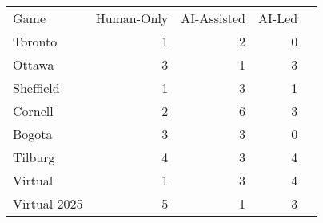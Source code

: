 \begin{tabular}{lrrrr}
\hline\hline
Game & Human-Only & AI-Assisted & AI-Led \\
Toronto & 1 & 2 & 0 \\
Ottawa & 3 & 1 & 3 \\
Sheffield & 1 & 3 & 1 \\
Cornell & 2 & 6 & 3 \\
Bogota & 3 & 3 & 0 \\
Tilburg & 4 & 3 & 4 \\
Virtual & 1 & 3 & 4 \\
Virtual 2025 & 5 & 1 & 3 \\
\hline\hline
\end{tabular}
